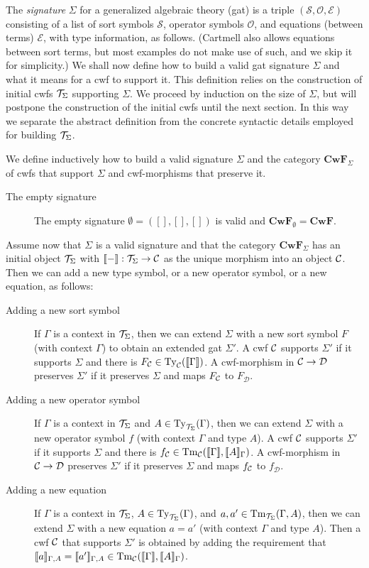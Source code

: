 \documentclass{lmcs}
\def\Sort{\mathcal{S}}
\def\Op{\mathcal{O}}
\def\Eq{\mathcal{E}}
\def\D{\mathcal{D}}
\def\Cwf{\mathbf{CwF}}
\begin{document}
The {\em signature} $\Sigma$ for a generalized algebraic theory (gat) is a triple $(\Sort,\Op,\Eq)$ consisting of a list of sort symbols $\Sort$, operator symbols $\Op$, and equations (between terms) $\Eq$, with type information, as follows. (Cartmell also allows equations between sort terms, but most examples do not make use of such, and we skip it for simplicity.) We shall now define how to build a valid gat signature $\Sigma$ and what it means for a cwf to support it. This definition relies on the construction of initial cwfs ${\mathcal T}_\Sigma$ supporting $\Sigma$. We proceed by induction on the size of $\Sigma$, but will postpone the construction of the initial cwfs until the next section. In this way we separate the abstract definition from the concrete syntactic details employed for building ${\mathcal T}_\Sigma$.
\begin{definition}
We define inductively how to build a valid signature $\Sigma$ and the category $\Cwf_\Sigma$ of cwfs that support $\Sigma$ and cwf-morphisms that preserve it.
\begin{description}
\item[The empty signature] The empty signature $\emptyset = ([],[],[])$ is valid and $\Cwf_\emptyset = \Cwf$. 
\end{description}
Assume now that $\Sigma$ is a valid signature and that the category $\Cwf_\Sigma$ has an initial object ${\mathcal T}_\Sigma$ with $\llbracket - \rrbracket : {\mathcal T}_\Sigma \to {\mathcal C}$ as the unique morphism into an object ${\mathcal C}$. Then we can add a new type symbol, or a new operator symbol, or a new equation, as follows:
\begin{description}
\item[Adding a new sort symbol] 
If $\Gamma$ is a context in ${\mathcal T}_\Sigma$, then we can extend $\Sigma$ with a new sort symbol $F$ (with context $\Gamma$) to obtain an extended gat $\Sigma'$. A cwf ${\mathcal C}$ supports $\Sigma'$ if it supports $\Sigma$ and there is $F_{\mathcal C} \in \mathrm{Ty}_{\mathcal C}(\llbracket \Gamma \rrbracket)$. A cwf-morphism in $\C \to \D$ preserves $\Sigma'$ if it preserves $\Sigma$ and maps $F_{\mathcal C}$ to $F_\D$.
\item[Adding a new operator symbol] 
If $\Gamma$ is a context in ${\mathcal T}_\Sigma$ and $A \in \mathrm{Ty}_{{\mathcal T}_\Sigma}(\Gamma)$, then we can extend $\Sigma$ with a new operator symbol $f$ (with context $\Gamma$ and type $A$). A cwf ${\mathcal C}$ supports $\Sigma'$ if it supports $\Sigma$ and there is $f_{\mathcal C} \in\mathrm{Tm}_{\mathcal C}(\llbracket \Gamma \rrbracket,\llbracket A \rrbracket_{\Gamma})$.
A cwf-morphism in $\C \to \D$ preserves $\Sigma'$ if it preserves $\Sigma$ and maps $f_{\mathcal C}$ to $f_\D$.
\item[Adding a new equation] 
If $\Gamma$ is a context in ${\mathcal T}_\Sigma$, $A \in \mathrm{Ty}_{{\mathcal T}_\Sigma}(\Gamma)$, and $a, a' \in \mathrm{Tm}_{{\mathcal T}_\Sigma}(\Gamma,A)$, then we can extend $\Sigma$ with a new equation $a = a'$ (with context $\Gamma$ and type $A$). Then a cwf ${\mathcal C}$ that supports $\Sigma'$ is obtained by adding the requirement that $\llbracket a \rrbracket_{\Gamma,A}= \llbracket a' \rrbracket_{\Gamma,A} \in \mathrm{Tm}_{\mathcal C}(\llbracket \Gamma \rrbracket,\llbracket A \rrbracket_\Gamma)$.
\end{description}
\end{definition}
\end{document}
